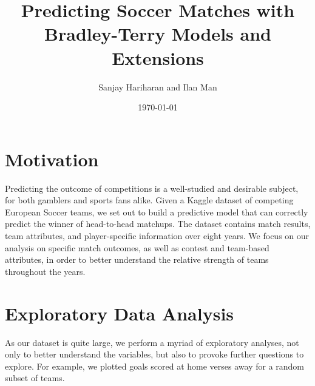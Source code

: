 \documentclass{article}
\title{Predicting Soccer Matches with Bradley-Terry Models and Extensions}
\author{Sanjay Hariharan and Ilan Man}
\date{\today}
\begin{document}
\maketitle

\section{Motivation}

Predicting the outcome of competitions is a well-studied and desirable subject, for both gamblers and sports fans alike. Given a Kaggle dataset of competing European Soccer teams, we set out to build a predictive model that can correctly predict the winner of head-to-head matchups. The dataset contains match results, team attributes, and player-specific information over eight years. We focus on our analysis on specific match outcomes, as well as contest and team-based attributes, in order to better understand the relative strength of teams throughout the years.

\section{Exploratory Data Analysis}

As our dataset is quite large, we perform a myriad of exploratory analyses, not only to better understand the variables, but also to provoke further questions to explore. For example, we plotted goals scored at home verses away for a random subset of teams. \\
\end{document}
